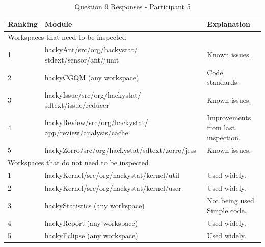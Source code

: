 \begin{table}[!h]
  \begin{center}
    \caption{Question 9 Responses - Participant 5}
    \label{tab:pre-selection-questionnaire-results-9-p5}
    \begin{tabular}{|p{2.0cm}|p{7.0cm}|p{4.0cm}|} \hline
{\bf Ranking} & {\bf Module} & {\bf Explanation} \\ \hline
\multicolumn{3}{|p{13.0cm}|}{Workspaces that need to be inspected} \\ \hline
1 & hackyAnt/src/org/hackystat/ stdext/sensor/ant/junit & Known issues. \\ \hline
2 & hackyCGQM (any workspace) & Code standards. \\ \hline
3 & hackyIssue/src/org/hackystat/ sdtext/issue/reducer & Known issues. \\ \hline
4 & hackyReview/src/org/hackystat/ app/review/analysis/cache & Improvements
from last inspection. \\ \hline
5 & hackyZorro/src/org/hackystat/sdtext/zorro/jess & Known issues. \\ \hline
\multicolumn{3}{|p{13.0cm}|}{Workspaces that do not need to be inspected} \\ \hline
1 & hackyKernel/src/org/hackystat/kernel/util & Used widely. \\ \hline
2 & hackyKernel/src/org/hackystat/kernel/user & Used widely. \\ \hline
3 & hackyStatistics (any workspace)  & Not being used. Simple code. \\ \hline
4 & hackyReport (any workspace) & Used widely. \\ \hline
5 & hackyEclipse (any workspace) & Used widely. \\ \hline
    \end{tabular}
  \end{center}
\end{table}


